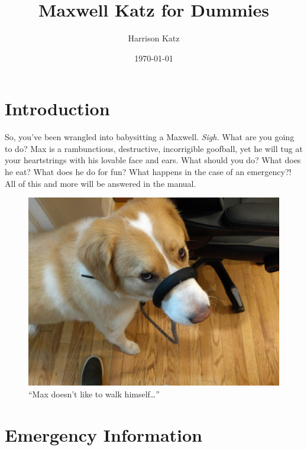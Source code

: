 \documentclass[pdftex,12pt]{article}
\title{Maxwell Katz for Dummies}
\author{Harrison Katz}
\date{\today}
\begin{document}



\newpage
\tableofcontents


\newpage
{}

\section{Introduction}

So, you've been wrangled into babysitting a Maxwell.
\emph{Sigh.}
What are you going to do?
Max is a rambunctious, destructive, incorrigible goofball,
yet he will tug at your heartstrings with his lovable face and ears.
What should you do?
What does he eat?
What does he do for fun?
What happens in the case of an emergency?!
All of this and more will be answered in the manual.

\bigskip

\begin{figure}[h!]\label{fig:walking_himself}
    \centering
    \includegraphics[width=.75\textwidth]{./images/max/walking_himself.jpg}
    \caption*{``Max doesn't like to walk himself\ldots''}
\end{figure}

\newpage
\section{Emergency Information}
\end{document}
